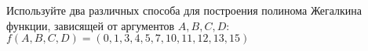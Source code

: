 \question Используйте два различных способа для построения полинома Жегалкина функции, зависящей от аргументов $A, B, C, D$:
$f(A,B,C,D) = (0,1,3,4,5,7,10,11,12,13,15)$